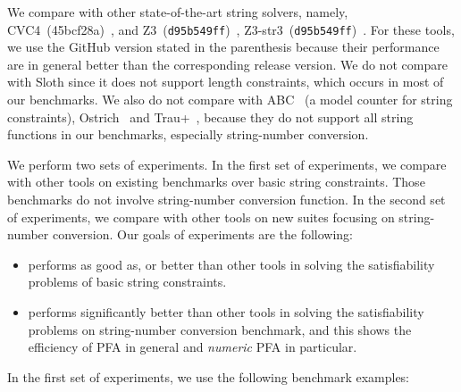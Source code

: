 We compare {\tool} with other state-of-the-art string solvers, namely, CVC4~(45bcf28a)~\cite{cvc4Tool}, and Z3~(\texttt{d95b549ff})~\cite{z3}, \textsf{Z3-str3}~(\texttt{d95b549ff})~\cite{zheng2013z3}. For these tools, we use the GitHub version stated in the parenthesis because their performance are in general better than the corresponding release version. 
We do not compare with Sloth \cite{sloth} since it does not support length constraints, which occurs in most of our benchmarks. We also do not compare with ABC~\cite{aydin2018parameterized} (a model counter for string constraints), Ostrich~\cite{chen2019decision} and \textsf{Trau+}~\cite{abdulla2019chain}, because they do not support all string functions in our benchmarks, especially string-number conversion.

We perform two sets of experiments. In the first set of experiments, we compare {\tool} with other tools on existing benchmarks over basic string constraints. Those benchmarks do not involve string-number conversion function. In the second set of experiments, we compare {\tool} with other tools on new suites focusing on string-number conversion. Our goals of experiments are the following:
\smallskip


\begin{itemize}
	\item {\tool} performs as good as, or better than other tools in solving the  satisfiability problems of basic string constraints.
	
		\smallskip

	\item {\tool} performs significantly better than other tools in solving the satisfiability problems on string-number conversion benchmark, and this shows  the efficiency of PFA in general and \emph{numeric} PFA in particular.
\end{itemize}
		\smallskip

In the first set of experiments, we use the following benchmark examples:

		\smallskip


